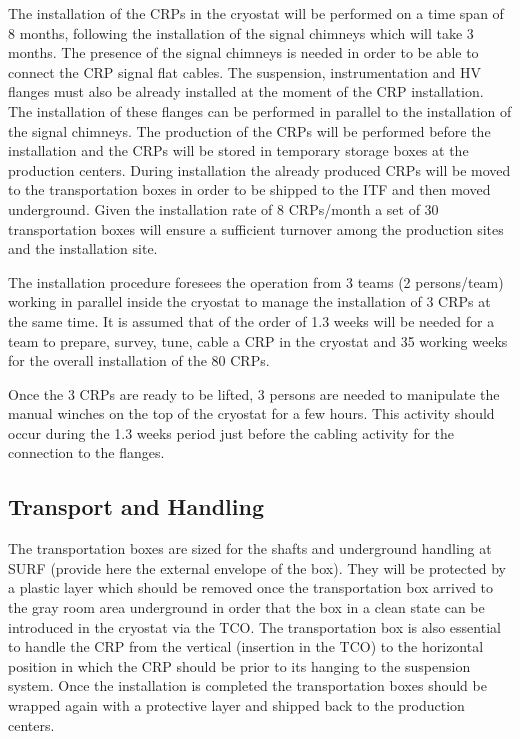 The installation of the CRPs in the cryostat will be performed on a time span of 8 months, following the installation of the signal chimneys which will take 3 months. The presence of the signal chimneys is needed in order to be able to connect the CRP signal flat cables. The suspension, instrumentation and HV flanges must also be already installed at the moment of the CRP installation. The installation of these flanges can be performed in parallel to the installation of the signal chimneys. The production of the CRPs will be performed before the installation and the CRPs will be stored in temporary storage boxes at the production centers. During installation the already produced CRPs will be moved to the transportation boxes in order to be shipped to the ITF and then moved underground. Given the installation rate of 8 CRPs/month a set of 30 transportation boxes will ensure a sufficient turnover among the production sites and the installation site.

The installation procedure foresees the operation from 3 teams (2 persons/team) working in parallel inside the cryostat to manage the installation of 3 CRPs at the same time. It is assumed that of the order of 1.3 weeks will be needed for a team to prepare, survey, tune, cable a CRP in the  cryostat and 35 working weeks for the overall installation of the 80 CRPs.

Once the 3 CRPs are ready to be lifted, 3 persons are needed to manipulate the manual winches on the top of the cryostat for a few hours. This activity should occur during the 1.3 weeks period just before the cabling activity for the connection to the flanges.


\subsection{Transport and Handling}
\label{sec:fddp-crp-install-transport}

The transportation boxes are sized for the shafts and underground handling at SURF (provide here the external envelope of the box). They will be protected by a plastic layer which should be removed once the transportation box arrived to the gray room area underground in order that the box in a clean state can be introduced in the cryostat via the TCO. The transportation box is also essential to handle the CRP from the vertical (insertion in the TCO) to the horizontal position in which the CRP should be prior to its hanging to the suspension system. Once the installation is completed the transportation boxes should be wrapped again with a protective layer and shipped back to the production centers. 

